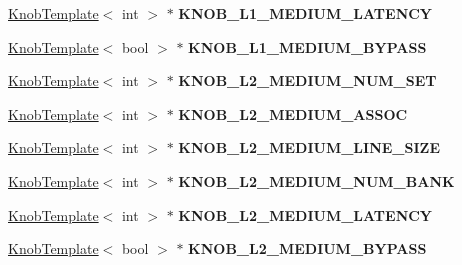 \begin{DoxyCompactItemize}
\item 
\hypertarget{classall__knobs__c_a77e5baa1e2ed499a307f13d198d822a1}{
\hyperlink{classKnobTemplate}{KnobTemplate}$<$ int $>$ $\ast$ {\bfseries KNOB\_\-L1\_\-MEDIUM\_\-LATENCY}}
\label{classall__knobs__c_a77e5baa1e2ed499a307f13d198d822a1}

\item 
\hypertarget{classall__knobs__c_a4c6d4bde5b72bea7d3f82be6887a859e}{
\hyperlink{classKnobTemplate}{KnobTemplate}$<$ bool $>$ $\ast$ {\bfseries KNOB\_\-L1\_\-MEDIUM\_\-BYPASS}}
\label{classall__knobs__c_a4c6d4bde5b72bea7d3f82be6887a859e}

\item 
\hypertarget{classall__knobs__c_a79e14f2762db9e8c3d1ef00c6e4c51a0}{
\hyperlink{classKnobTemplate}{KnobTemplate}$<$ int $>$ $\ast$ {\bfseries KNOB\_\-L2\_\-MEDIUM\_\-NUM\_\-SET}}
\label{classall__knobs__c_a79e14f2762db9e8c3d1ef00c6e4c51a0}

\item 
\hypertarget{classall__knobs__c_af67cbca9d3dc839df36ae750b9c3f14d}{
\hyperlink{classKnobTemplate}{KnobTemplate}$<$ int $>$ $\ast$ {\bfseries KNOB\_\-L2\_\-MEDIUM\_\-ASSOC}}
\label{classall__knobs__c_af67cbca9d3dc839df36ae750b9c3f14d}

\item 
\hypertarget{classall__knobs__c_a8a85b1ccd66f494ed4ca8691406d0efa}{
\hyperlink{classKnobTemplate}{KnobTemplate}$<$ int $>$ $\ast$ {\bfseries KNOB\_\-L2\_\-MEDIUM\_\-LINE\_\-SIZE}}
\label{classall__knobs__c_a8a85b1ccd66f494ed4ca8691406d0efa}

\item 
\hypertarget{classall__knobs__c_a4fb20bc27295e336e4f484631354d12a}{
\hyperlink{classKnobTemplate}{KnobTemplate}$<$ int $>$ $\ast$ {\bfseries KNOB\_\-L2\_\-MEDIUM\_\-NUM\_\-BANK}}
\label{classall__knobs__c_a4fb20bc27295e336e4f484631354d12a}

\item 
\hypertarget{classall__knobs__c_a9a80178e70ac4a2ca801350bb43c9637}{
\hyperlink{classKnobTemplate}{KnobTemplate}$<$ int $>$ $\ast$ {\bfseries KNOB\_\-L2\_\-MEDIUM\_\-LATENCY}}
\label{classall__knobs__c_a9a80178e70ac4a2ca801350bb43c9637}

\item 
\hypertarget{classall__knobs__c_a2dea03e539e498b33d0c6b3bc5999158}{
\hyperlink{classKnobTemplate}{KnobTemplate}$<$ bool $>$ $\ast$ {\bfseries KNOB\_\-L2\_\-MEDIUM\_\-BYPASS}}
\label{classall__knobs__c_a2dea03e539e498b33d0c6b3bc5999158}


\end{DoxyCompactItemize}
